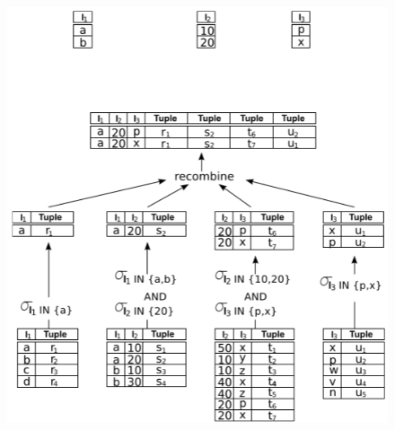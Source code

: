\documentclass{report}
\begin{document}
\begin{enumerate}
    \begin{figure}[H]
        \centering
        \includegraphics[width=1\linewidth]{images/step2.png}
    \end{figure}

\end{enumerate}
\end{document}
